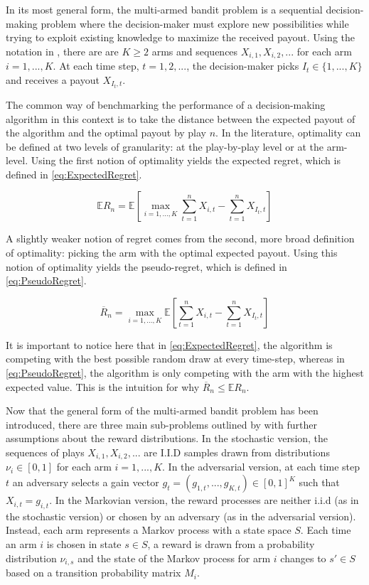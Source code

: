 In its most general form, the multi-armed bandit problem is a sequential decision-making problem where the decision-maker must explore new possibilities while trying to exploit existing knowledge to maximize the received payout. Using the notation in \cite{bubeck12}, there are are $K \geq{2}$ arms and sequences $X_{i, 1}, X_{i, 2}, ... $ for each arm $i = 1, ..., K$. At each time step, $t = 1, 2, ...$, the decision-maker picks $I_t \in \{1, ..., K\}$ and receives a payout $X_{I_t, t}$.

The common way of benchmarking the performance of a decision-making algorithm in this context is to take the distance between the expected payout of the algorithm and the optimal payout by play $n$. In the literature, optimality can be defined at two levels of granularity: at the play-by-play level or at the arm-level. Using the first notion of optimality yields the expected regret, which is defined in \ref{eq:ExpectedRegret}.

\begin{equation}
\label{eq:ExpectedRegret}
\mathbb{E}R_n = \mathbb{E}\left[ \max_{i=1, ..., K}{\sum_{t=1}^{n}{X_{i, t}}} - \sum_{t=1}^{n}{X_{I_t, t}}\right]
\end{equation}

A slightly weaker notion of regret comes from the second, more broad definition of optimality: picking the arm with the optimal expected payout. Using this notion of optimality yields the pseudo-regret, which is defined in \ref{eq:PseudoRegret}.

\begin{equation}
\label{eq:PseudoRegret}
\overline{R}_n = \max_{i=1, ..., K}\mathbb{E}\left[\sum_{t=1}^{n}{X_{i, t}} - \sum_{t=1}^{n}{X_{I_t, t}}\right]
\end{equation}

It is important to notice here that in \ref{eq:ExpectedRegret}, the algorithm is competing with the best possible random draw at every time-step, whereas in \ref{eq:PseudoRegret}, the algorithm is only competing with the arm with the highest expected value. This is the intuition for why $\overline{R}_n \leq{\mathbb{E}R_n}$.

Now that the general form of the multi-armed bandit problem has been introduced, there are three main sub-problems outlined by \cite{bubeck12} with further assumptions about the reward distributions. In the stochastic version, the sequences of plays $X_{i, 1}, X_{i, 2}, ... $ are I.I.D samples drawn from distributions $\nu_i \in [0, 1]$ for each arm $i = 1, ..., K$. In the adversarial version, at each time step $t$ an adversary selects a gain vector $g_t = (g_{1, t}, ..., g_{K, t}) \in [0, 1]^{K}$ such that $X_{i, t} = g_{i, t}$. In the Markovian version, the reward processes are neither i.i.d (as in the stochastic version) or chosen by an adversary (as in the adversarial version). Instead, each arm represents a Markov process with a state space $S$. Each time an arm $i$ is chosen in state $s \in{S}$, a reward is drawn from a probability distribution $\nu_{i, s}$ and the state of the Markov process for arm $i$ changes to $s' \in {S}$ based on a transition probability matrix $M_i$.


